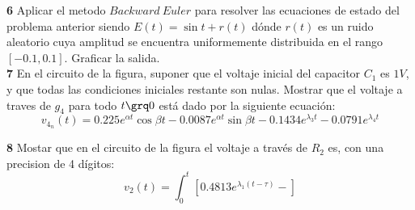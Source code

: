 \documentclass[10pt,a4paper]{article} %
\begin{document}
	\textbf{6} Aplicar el metodo $Backward\ Euler$ para resolver las ecuaciones de estado del problema anterior siendo $E(t)=\sin t + r(t)$ dónde $r(t)$ es un ruido aleatorio cuya amplitud se encuentra uniformemente distribuida en el rango $[-0.1,0.1]$. Graficar la salida.\\
	
	\textbf{7} En el circuito de la figura, suponer que el voltaje inicial del capacitor $C_1$ es $1V$, y que todas las condiciones iniciales restante son nulas. Mostrar que el voltaje a traves de $g_4$ para todo $t\grq 0$ está dado por la siguiente ecuación:
	\begin{equation}
		v_{4_n}(t)=0.225e^{\alpha t}\cos \beta t-0.0087e^{\alpha t}\sin \beta t-0.1434e^{\lambda_3 t}-0.0791e^{\lambda_4 t}
	\end{equation}
	
	\textbf{8} Mostar que en el circuito de la figura el voltaje a través de $R_2$ es, con una precision de 4 dígitos:
	\begin{equation}
		v_2(t)=\int_{0}^{t}\left[0.4813e^{\lambda_1(t-\tau)}-\right]
	\end{equation}
	
\end{document}

